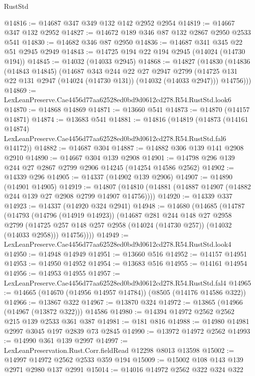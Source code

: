 \begin{lexlean}{RustStd}
\begin{coremodule}
@14816 := @14687 @347 @349 @132 @142 @2952 @2954
@14819 := @14667 @347 @132 @2952
@14827 := @14672 @189 @346 @87 @132 @2867 @2950 @2533 @541
@14830 := @14682 @346 @87 @2950
@14836 := @14687 @341 @345 @22 @51 @2945 @2949
@14843 := @14725 @194 @22 @194 @2945 (@14024 (@14730 @194))
@14845 := @14032 (@14033 @2945)
@14868 := @14827
    (@14830
      (@14836
        (@14843 @14845)
        (@14687
          @343
          @244
          @22
          @27
          @2947
          @2799
          (@14725 @131 @22 @131 @2947 (@14024 (@14730 @131)) (@14032 (@14033 @2947)))
          @14756)))
@14869 := LexLeanPreserve.Cae4456d77aa62528ed0bd9d0612cd278.R54.RustStd.look6
@14870 := @14868 @14869
@14871 := @13660 @541
@14873 := @14870 (@14157 @14871)
@14874 := @13683 @541
@14881 := @14816
    (@14819
      (@14873
        (@14161 @14874)
        LexLeanPreserve.Cae4456d77aa62528ed0bd9d0612cd278.R54.RustStd.fal6
        @14172))
@14882 := @14687 @304
@14887 := @14882 @306 @139 @141 @2908 @2910
@14890 := @14667 @304 @139 @2908
@14901 := @14798 @296 @139 @244 @27 @2867 @2799 @2906 @14245 (@14254 @14586 @2562)
@14902 := @14339 @296
@14905 := @14337 (@14902 @139 @2906)
@14907 := @14890 (@14901 @14905)
@14919 := @14807 (@14810 (@14881 (@14887 @14907 (@14882 @244 @139 @27 @2908 @2799 @14907 @14756))))
@14920 := @14339 @337
@14923 := @14337 (@14920 @324 @2941)
@14948 := @14680
    (@14685
      (@14787
        (@14793
          (@14796 (@14919 @14923))
          (@14687
            @281
            @244
            @148
            @27
            @2958
            @2799
            (@14725 @257 @148 @257 @2958 (@14024 (@14730 @257)) (@14032 (@14033 @2958)))
            @14756))))
@14949 := LexLeanPreserve.Cae4456d77aa62528ed0bd9d0612cd278.R54.RustStd.look4
@14950 := @14948 @14949
@14951 := @13660 @516
@14952 := @14157 @14951
@14953 := @14950 @14952
@14954 := @13683 @516
@14955 := @14161 @14954
@14956 := @14953 @14955
@14957 := LexLeanPreserve.Cae4456d77aa62528ed0bd9d0612cd278.R54.RustStd.fal4
@14965 := @14665 (@14670 (@14956 @14957 @14784)) (@8505 (@14176 @14586 @322))
@14966 := @13867 @322
@14967 := @13870 @324
@14972 := @13865 (@14966 (@14967 (@13872 @322))) @14586
@14980 := @14394 @14972 @2562 @2562 @215 @139 @2533 @361 @387
@14981 := @181 @816
@14988 := @14980 @14981 @2997 @3045 @197 @2839 @73 @2845
@14990 := @13972 @14972 @2562
@14993 := @14990 @361 @139 @2997
@14997 := LexLeanPreservation.Rust.Corr.fieldRead @12298 @8013 @13598
@15002 := @14997 @14972 @2562 @2533 @359 @194
@15009 := @15002 @108 @143 @139 @2971 @2980 @137 @2991
@15014 := @14016 @14972 @2562 @322 @324 @322

\end{coremodule}
\end{lexlean}
